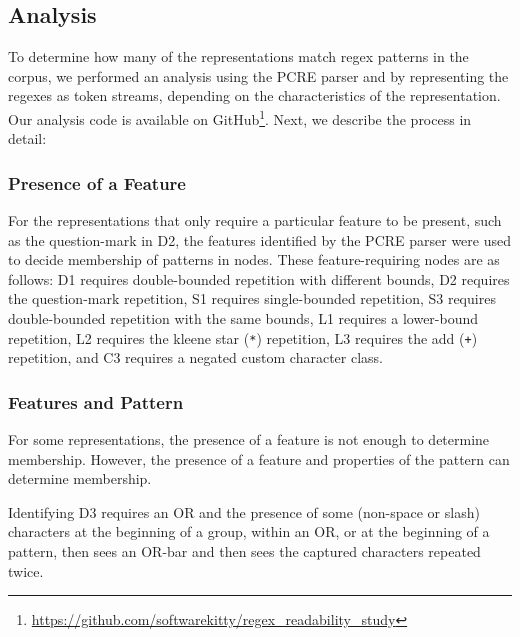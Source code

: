 





\subsection{Analysis}
\label{communityanalysis}
To determine how many of the representations match regex patterns in the corpus, we performed an analysis using the PCRE parser and by representing the regexes as token streams, depending on the characteristics of the representation. Our analysis code is available on GitHub\footnote{\url{https://github.com/softwarekitty/regex_readability_study}}. Next, we describe the process in detail:

\subsubsection{Presence of a Feature}
For the representations that only require a particular feature to be present, such as the question-mark in D2, the features identified by the PCRE parser were used to decide membership of patterns in nodes.
These feature-requiring nodes are as follows: D1 requires double-bounded repetition with different bounds, D2 requires the question-mark repetition, S1 requires single-bounded repetition, S3 requires double-bounded repetition with the same bounds,  L1 requires a lower-bound repetition, L2 requires the kleene star (\verb!*!) repetition, L3 requires the add (\verb!+!) repetition, and C3 requires a negated custom character class.

\subsubsection{Features  and Pattern}
For some representations, the presence of a feature is not enough to determine membership.
However,  the presence of a feature and properties of the pattern can determine membership.


Identifying D3 requires an OR and the presence of some (non-space or slash) characters at the beginning of a group, within an OR, or at the beginning of a pattern, then sees an OR-bar and then sees the captured characters repeated twice. 

